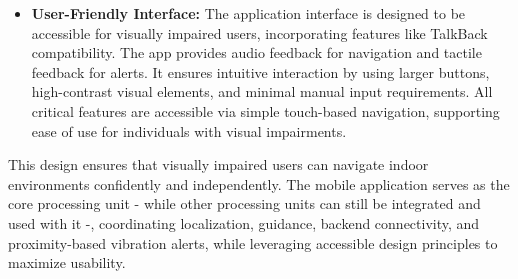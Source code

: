 \begin{itemize}
	\item \textbf{User-Friendly Interface:} The application interface is designed to be accessible for visually impaired users, incorporating features like TalkBack compatibility. The app provides audio feedback for navigation and tactile feedback for alerts. It ensures intuitive interaction by using larger buttons, high-contrast visual elements, and minimal manual input requirements. All critical features are accessible via simple touch-based navigation, supporting ease of use for individuals with visual impairments.
	
\end{itemize}

This design ensures that visually impaired users can navigate indoor environments confidently and independently. The mobile application serves as the core processing unit - while other processing units can still be integrated and used with it -, coordinating localization, guidance, backend connectivity, and proximity-based vibration alerts, while leveraging accessible design principles to maximize usability.
